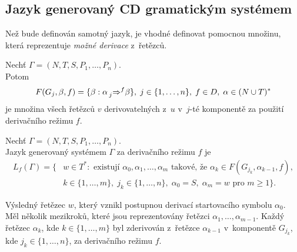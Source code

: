 \subsection*{Jazyk generovaný CD gramatickým systémem}
Než bude definován samotný jazyk, je vhodné definovat pomocnou množinu, která reprezentuje \emph{možné derivace} z~řetězců.
\begin{definition}\label{def_mozne_derivace}
    Nechť $\Gamma = (N, T, S, P_1, \ldots, P_n)$. \\  
    Potom 
    \begin{equation*}
        F(G_j,\beta,f)=\{\beta : \alpha \prescript{}{j}{\Rightarrow^{f}}\beta\},\; j \in \{1, \ldots, n\},\; f\in D,\; \alpha \in (N \cup T)^{*}
    \end{equation*}        
    je množina všech řetězců $v$ derivovatelných z~$u$ v~$j$-té komponentě za použití derivačního režimu $f$.
\end{definition}

\begin{definition}\label{def_generovany_jazyk}
    Nechť $\Gamma = (N, T, S, P_1, \ldots, P_n)$. \\  
    Jazyk generovaný systémem $\Gamma$ za derivačního režimu $f$ je 
    \begin{align*}
         L_f(\Gamma) = \{&w \in T^*: \text{ existují } \alpha_0, \alpha_1,\ldots, \alpha_m \text{ takové, že } \alpha_k \in F(G_{j_{k}},\alpha_{k-1}, f),\\
         &k \in \{1, \ldots, m\},\;j_k \in \{1, \ldots, n\},\; \alpha_0 = S,\;\alpha_m = w \text{ pro } m \geq 1\}.
    \end{align*}        
\end{definition} 

Výsledný řetězec $w$, který vznikl postupnou derivací startovacího symbolu $\alpha_0$.
Měl několik mezikroků, které jsou reprezentovány řetězci $\alpha_1, \ldots, \alpha_{m-1}$.
Každý řetězec $\alpha_k$, kde $k \in \{1, \ldots, m\}$ byl zderivován z~řetězce $\alpha_{k-1}$ v~komponentě $G_{j_{k}}$, kde $j_k \in \{1, \ldots, n\}$, za derivačního režimu $f$.

